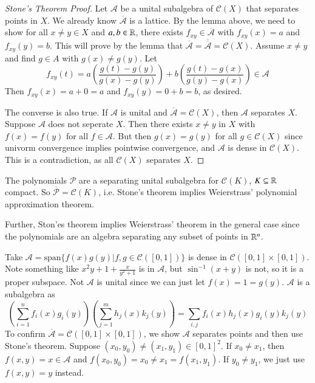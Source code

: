\begin{proof}[Stone's Theorem Proof]
    Let $\mathcal{A}$ be a unital subalgebra of $\mathcal{C}(X)$ that separates points in $X$. We already know $\overline{\mathcal{A}}$ is a lattice. By the lemma above, we need to show for all $x \neq y \in X$ and $a,b \in \mathbb R$, there exists $f_{xy} \in \overline{\mathcal{A}}$ with $f_{xy}(x) = a$ and $f_{xy}(y) = b$. This will prove by the lemma that $\overline{\mathcal{A}} = \overline{\overline{\mathcal{A}}} = \mathcal{C}(X)$. Assume $x \neq y$ and find $g \in A$ with $g(x) \neq g(y)$. Let $$f_{xy}(t) = a\left(\frac{g(t) - g(y)}{g(x) - g(y)}\right) + b \left(\frac{g(t) - g(x)}{g(y) - g(x)}\right) \in \mathcal{A}$$ Then $f_{xy}(x) = a+0 = a$ and $f_{xy}(y) = 0+b= b$, as desired.

    The converse is also true. If $\mathcal{A}$ is unital and $\overline{\mathcal{A}} = \mathcal{C}(X)$, then $\mathcal{A}$ separates $X$. Suppose $\mathcal{A}$ does not seperate $X$. Then there exists $x \neq y$ in $X$ with $f(x) = f(y)$ for all $f \in \mathcal{A}$. But then $g(x) = g(y)$ for all $g \in \mathcal{C}(X)$ since univorm convergence implies pointwise convergence, and $\mathcal{A}$ is dense in $\mathcal{C}(X)$. This is a contradiction, as all $\mathcal{C}(X)$ separates $X$.
\end{proof}

\begin{eg}
    The polynomials $\mathcal{P}$ are a separating unital subalgebra for $\mathcal{C}(K)$, $K \subseteq \mathbb R$ compact. So $\overline{\mathcal{P}} = \mathcal{C}(K)$, i.e. Stone's theorem implies Weierstrass' polynomial approximation theorem.
\end{eg}

Further, Ston'es theorem implies Weierstrass' theorem in the general case since the polynomials are an algebra separating any subset of points in $\mathbb R^n$.

\begin{eg}
    Take $\mathcal{A} = \text{span}\{f(x)g(y)\vert f,g \in \mathcal{C}([0,1])\}$ is dense in $\mathcal{C}([0,1]\times[0,1])$. Note something like $x^2y + 1 + \frac{x}{y^2+1}$ is in $\mathcal{A}$, but $\sin^{-1}(x+y)$ is not, so it is a proper subspace. Not $\mathcal{A}$ is unital since we can just let $f(x) = 1 = g(y)$. $\mathcal{A}$ is a subalgebra as \begin{equation*}
        \left(\sum_{i=1}^nf_i(x)g_i(y)\right)\left(\sum_{j=1}^mh_j(x)k_j(y)\right) = \sum_{i,j}f_i(x)h_j(x)g_i(y)k_j(y)
    \end{equation*}
    To confirm $\overline{\mathcal{A}} = \mathcal{C}([0,1]\times [0,1])$, we show $\mathcal{A}$ separates points and then use Stone's theorem. Suppose $(x_0,y_0) \neq (x_1,y_1) \in [0,1]^2$. If $x_0 \neq x_1$, then $f(x,y) = x \in \mathcal{A}$ and $f(x_0,y_0) = x_0 \neq x_1 = f(x_1,y_1)$. If $y_0 \neq y_1$, we just use $f(x,y) = y$ instead.
\end{eg}


